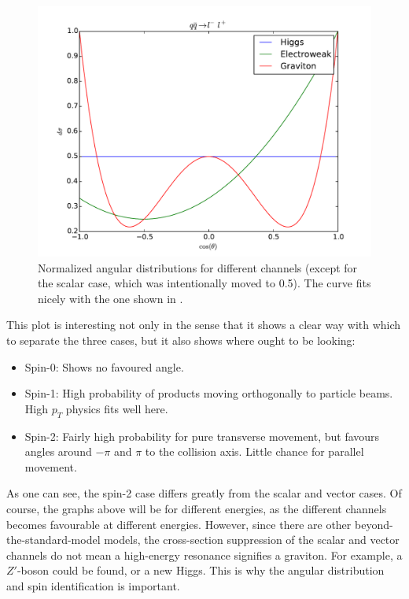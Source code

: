 \documentclass[11pt,a4paper]{article}
\begin{document}
\begin{figure}[H]
	\centering
	\includegraphics[scale=0.4]{angDist.pdf}
	\caption{Normalized angular distributions for different channels (except for the scalar case, which was intentionally moved to 0.5). The curve fits nicely with the one shown in \cite{AOPW}.}
	\label{fig:1a}
\end{figure}

This plot is interesting not only in the sense that it shows a clear way with which to separate the three cases, but it also shows where ought to be looking:

\begin{itemize}
	\item Spin-0: Shows no favoured angle.
	\item Spin-1: High probability of products moving orthogonally to particle beams. High $p_T$ physics fits well here.
	\item Spin-2: Fairly high probability for pure transverse movement, but favours angles around $-\pi$ and $\pi$ to the collision axis. Little chance for parallel movement.
\end{itemize}

As one can see, the spin-2 case differs greatly from the scalar and vector cases. Of course, the graphs above will be for different energies, as the different channels becomes favourable at different energies. However, since there are other beyond-the-standard-model models, the cross-section suppression of the scalar and vector channels do not mean a high-energy resonance signifies a graviton. For example, a $Z'$-boson could be found, or a new Higgs. This is why the angular distribution and spin identification is important.
\end{document}
